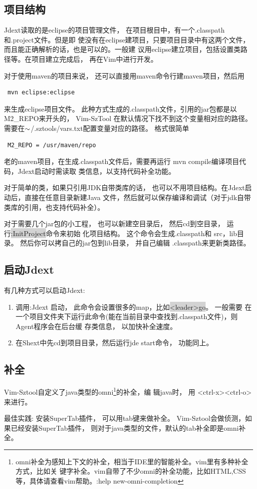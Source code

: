 \documentclass[oneside,openany]{book}
\begin{document}
\subsection{项目结构}
    Jdext读取的是eclipse的项目管理文件， 在项目根目中，有一个.classpath和.project文件。但是即
使没有在eclipse建项目，只要项目目录中有这两个文件，而且能正确解析的话，也是可以的。一般建
议用eclipse建立项目，包括设置类路径等。在项目建立完成后， 再在Vim中进行开发。

   对于使用maven的项目来说， 还可以直接用maven命令行建maven项目，然后用
  \begin{verbatim} mvn eclipse:eclipse \end{verbatim}
  来生成eclipse项目文件。 此种方式生成的.classpath文件，引用的jar包都是以M2\_REPO来开头的， Vim-SzTool
在默认情况下找不到这个变量相对应的路径。 需要在$\tiny{\sim}$/.sztools/vars.txt配置变量对应的路径。 格式很简单
  \begin{verbatim} M2_REPO = /usr/maven/repo \end{verbatim}

  老的maven项目，在生成.classpath文件后，需要再运行 mvn compile编译项目代码，Jdext启动时需读取
类信息，以支持代码补全功能。

   对于简单的类，如果只引用JDK自带类库的话， 也可以不用项目结构。在Jdext启动后，直接在任意目录新建Java
文件，然后就可以保存编译和调试（对于jdk自带类库的引用，也支持代码补全）。
  
   对于需要几个jar包的小工程， 也可以新建空目录后， 然后cd到空目录， 运行\colorbox{lightgray}{:InitProject}命令来初始
化项目结构。 这个命令会生成.classpath和 src，lib目录。 然后你可以拷自己的jar包到lib目录， 并自己编辑
.classpath来更新类路径。

\subsection{启动Jdext}
   有几种方式可以启动Jdext:
    \begin{enumerate}
      \item 调用:Jdext 启动， 此命令会设置很多的map，比如\colorbox{lightgray}{<leader>go}。 一般需要
        在一个项目文件夹下运行此命令(能在当前目录中查找到.classpath文件)，则Agent程序会在后台缓
        存类信息， 以加快补全速度。
      \item 在Shext中先cd到项目目录，然后运行jde start命令， 功能同上。
    \end{enumerate}

\subsection{补全}
    Vim-Sztool自定义了java类型的omni\footnote{omni补全为感知上下文的补全，相当于IDE里的智能补全。vim里有多种补全方式，比如关
    键字补全。vim自带了不少omni的补全功能，比如HTML,CSS等，具体请查看vim帮助。:help new-omni-completion }的补全，编
    辑java时， 用 <ctrl-x><ctrl-o> 来进行。
    \begin{mdframed}[style=BestPracticeFrame]
      最佳实践: 安装SuperTab插件， 可以用tab键来做补全。
      Vim-Sztool会做侦测，如果已经安装SuperTab插件， 则对于java类型的文件，默认的tab补全即是omni补全。
    \end{mdframed}
\end{document}
